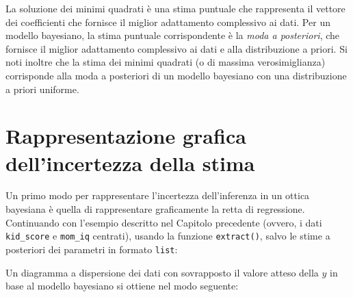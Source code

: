 \documentclass[
]{memoir}
\newenvironment{Shaded}{\begin{snugshade}}{\end{snugshade}}
\newcommand{\AttributeTok}[1]{\textcolor[rgb]{0.77,0.63,0.00}{#1}}
\newcommand{\DecValTok}[1]{\textcolor[rgb]{0.00,0.00,0.81}{#1}}
\newcommand{\FunctionTok}[1]{\textcolor[rgb]{0.00,0.00,0.00}{#1}}
\newcommand{\NormalTok}[1]{#1}
\newcommand{\OtherTok}[1]{\textcolor[rgb]{0.56,0.35,0.01}{#1}}
\newcommand{\SpecialCharTok}[1]{\textcolor[rgb]{0.00,0.00,0.00}{#1}}
\newcommand{\StringTok}[1]{\textcolor[rgb]{0.31,0.60,0.02}{#1}}
\begin{document}
La soluzione dei minimi quadrati è una stima puntuale che rappresenta il vettore dei coefficienti che fornisce il miglior adattamento complessivo ai dati. Per un modello bayesiano, la stima puntuale corrispondente è la \emph{moda a posteriori}, che fornisce il miglior adattamento complessivo ai dati e alla distribuzione a priori. Si noti inoltre che la stima dei minimi quadrati (o di massima verosimiglianza) corrisponde alla moda a posteriori di un modello bayesiano con una distribuzione a priori uniforme.

\hypertarget{rappresentazione-grafica-dellincertezza-della-stima-1}{%
\section{Rappresentazione grafica dell'incertezza della stima}\label{rappresentazione-grafica-dellincertezza-della-stima-1}}

Un primo modo per rappresentare l'incertezza dell'inferenza in un ottica bayesiana è quella di rappresentare graficamente la retta di regressione. Continuando con l'esempio descritto nel Capitolo precedente (ovvero, i dati \texttt{kid\_score} e \texttt{mom\_iq} centrati), usando la funzione \texttt{extract()}, salvo le stime a posteriori dei parametri in formato \texttt{list}:

\begin{Shaded}
\end{Shaded}

Un diagramma a dispersione dei dati con sovrapposto il valore atteso della \(y\) in base al modello bayesiano si ottiene nel modo seguente:

\begin{Shaded}
\end{Shaded}
\end{document}
